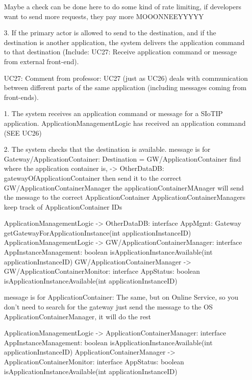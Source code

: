                     Maybe a check can be done here to do some kind of rate limiting, if developers want to send
                    more requests, they pay more MOOONNEEYYYYY

            3. If the primary actor is allowed to send to the destination, and if the destination is another application,
               the system delivers the application command to that destination
                    (Include: UC27: Receive application command or message from external front-end).

        UC27:
            Comment from professor:
               UC27 (just as UC26) deals with communication between different parts of the same application (including messages coming from front-ends).

            1. The system receives an application command or message for a SIoTIP application.
                ApplicationManagementLogic has received an application command (SEE UC26)

            2. The system checks that the destination is available.
                message is for Gateway/ApplicationContainer:
                    Destination = GW/ApplicationContainer
                    find where the application container is, -> OtherDataDB: gatewayOfApplicationContainer
                    then send it to the correct GW/ApplicationContainerManager
                    the applicationContainerMAnager will send the message to the correct ApplicationContainer
                    ApplicationContainerManagers keep track of ApplicationContainer IDs

                    ApplicationManagementLogic -> OtherDataDB: interface AppMgmt: Gateway getGatewayForApplicationInstance(int applicationInstanceID)
                    ApplicationManagementLogic -> GW/ApplicationContainerManager: interface AppInstanceManagement: boolean isApplicationInstanceAvailable(int applicationInstanceID)
                    GW/ApplicationContainerManager -> GW/ApplicationContainerMonitor: interface AppStatus: boolean isApplicationInstanceAvailable(int applicationInstanceID)

                message is for ApplicationContainer:
                    The same, but on Online Service, so you don't need to search for the gateway
                    just send the message to the OS ApplicationContainerManager, it will do the rest

                    ApplicationManagementLogic -> ApplicationContainerManager: interface AppInstanceManagement: boolean isApplicationInstanceAvailable(int applicationInstanceID)
                    ApplicationContainerManager -> ApplicationContainerMonitor: interface AppStatus: boolean isApplicationInstanceAvailable(int applicationInstanceID)

